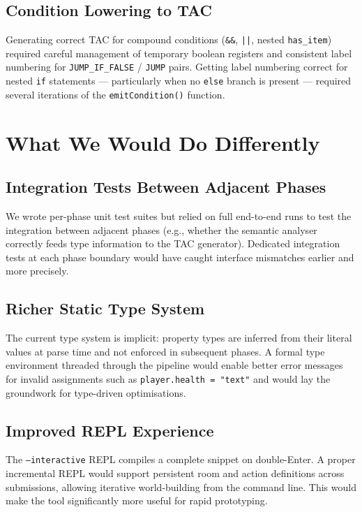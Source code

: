 \documentclass[12pt, a4paper]{article}
\begin{document}
\subsection{Condition Lowering to TAC}
Generating correct TAC for compound conditions (\texttt{\&\&}, \texttt{||}, nested
\texttt{has\_item}) required careful management of temporary boolean registers and
consistent label numbering for \texttt{JUMP\_IF\_FALSE} / \texttt{JUMP} pairs.
Getting label numbering correct for nested \texttt{if} statements --- particularly
when no \texttt{else} branch is present --- required several iterations of the
\texttt{emitCondition()} function.

\section{What We Would Do Differently}

\subsection{Integration Tests Between Adjacent Phases}
We wrote per-phase unit test suites but relied on full end-to-end runs to test
the integration between adjacent phases (e.g., whether the semantic analyser
correctly feeds type information to the TAC generator).
Dedicated integration tests at each phase boundary would have caught interface
mismatches earlier and more precisely.

\subsection{Richer Static Type System}
The current type system is implicit: property types are inferred from their literal
values at parse time and not enforced in subsequent phases.
A formal type environment threaded through the pipeline would enable better error
messages for invalid assignments such as \texttt{player.health = "text"}
and would lay the groundwork for type-driven optimisations.

\subsection{Improved REPL Experience}
The \texttt{--interactive} REPL compiles a complete snippet on double-Enter.
A proper incremental REPL would support persistent room and action definitions
across submissions, allowing iterative world-building from the command line.
This would make the tool significantly more useful for rapid prototyping.
\end{document}
